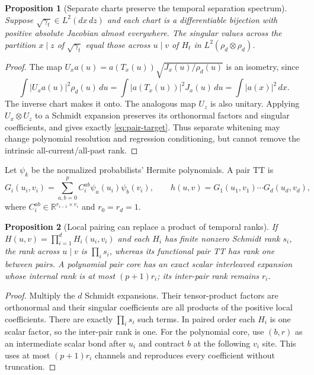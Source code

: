 \documentclass[11pt]{article}
\newtheorem{proposition}{Proposition}
\begin{document}
\begin{proposition}[Separate charts preserve the temporal separation spectrum]
\label{prop:pair-unitary}
Suppose $\sqrt{\gamma_t}\in L^2(dx\,dz)$ and each chart is a differentiable
bijection with positive absolute Jacobian almost everywhere. The singular
values across the partition $x\mid z$ of $\sqrt{\gamma_t}$ equal those across
$u\mid v$ of $H_t$ in $L^2(\rho_d\otimes\rho_d)$.
\end{proposition}
\begin{proof}
The map $U_xa(u)=a(T_x(u))\sqrt{J_x(u)/\rho_d(u)}$ is an isometry, since
\begin{equation}
 \int |U_xa(u)|^2\rho_d(u)\,du
 =\int |a(T_x(u))|^2J_x(u)\,du=\int|a(x)|^2\,dx.
 \label{eq:pair-unitary-norm}
\end{equation}
The inverse chart makes it onto. The analogous map $U_z$ is also unitary.
Applying $U_x\otimes U_z$ to a Schmidt expansion preserves its orthonormal
factors and singular coefficients, and gives exactly \eqref{eq:pair-target}.
Thus separate whitening may change polynomial resolution and regression
conditioning, but cannot remove the intrinsic all-current/all-past rank.
\end{proof}

Let $\psi_k$ be the normalized probabilists' Hermite polynomials. A pair TT is
\begin{equation}
 G_i(u_i,v_i)=\sum_{a,b=0}^p C_i^{ab}\psi_a(u_i)\psi_b(v_i),\qquad
 h(u,v)=G_1(u_1,v_1)\cdots G_d(u_d,v_d),
 \label{eq:pair-amplitude}
\end{equation}
where $C_i^{ab}\in\mathbb R^{r_{i-1}\times r_i}$ and $r_0=r_d=1$.
\begin{proposition}[Local pairing can replace a product of temporal ranks]
\label{prop:pair-rank}
If $H(u,v)=\prod_{i=1}^dH_i(u_i,v_i)$ and each $H_i$ has finite nonzero
Schmidt rank $s_i$, the rank across $u\mid v$ is $\prod_i s_i$, whereas its
functional pair TT has rank one between pairs. A polynomial pair core has an
exact scalar interleaved expansion whose internal rank is at most
$(p+1)r_i$; its inter-pair rank remains $r_i$.
\end{proposition}
\begin{proof}
Multiply the $d$ Schmidt expansions. Their tensor-product factors are
orthonormal and their singular coefficients are all products of the positive
local coefficients. There are exactly $\prod_i s_i$ such terms. In paired
order each $H_i$ is one scalar factor, so the inter-pair rank is one. For the
polynomial core, use $(b,r)$ as an intermediate scalar bond after $u_i$ and
contract $b$ at the following $v_i$ site. This uses at most $(p+1)r_i$ channels
and reproduces every coefficient without truncation.
\end{proof}
\end{document}
